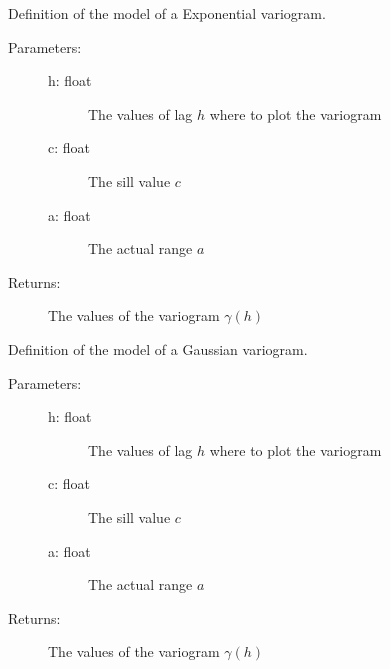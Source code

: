 \documentclass[letterpaper,10pt,english]{sphinxmanual}
\begin{document}

\begin{fulllineitems}
\label{\detokenize{appendices:s2Dcd.gslibnumpy.exponential}}
Definition of the model of a Exponential variogram.
\begin{description}
\item[{Parameters:}] \leavevmode\begin{description}
\item[{h: float}] \leavevmode
The values of lag \(h\) where to plot the variogram

\item[{c: float}] \leavevmode
The sill value \(c\)

\item[{a: float}] \leavevmode
The actual range \(a\)

\end{description}

\item[{Returns:}] \leavevmode
The values of the variogram \(\gamma(h)\)

\end{description}

\end{fulllineitems}


\begin{fulllineitems}
\label{\detokenize{appendices:s2Dcd.gslibnumpy.gaussian}}
Definition of the model of a Gaussian variogram.
\begin{description}
\item[{Parameters:}] \leavevmode\begin{description}
\item[{h: float}] \leavevmode
The values of lag \(h\) where to plot the variogram

\item[{c: float}] \leavevmode
The sill value \(c\)

\item[{a: float}] \leavevmode
The actual range \(a\)

\end{description}

\item[{Returns:}] \leavevmode
The values of the variogram \(\gamma(h)\)

\end{description}

\end{fulllineitems}
\end{document}
